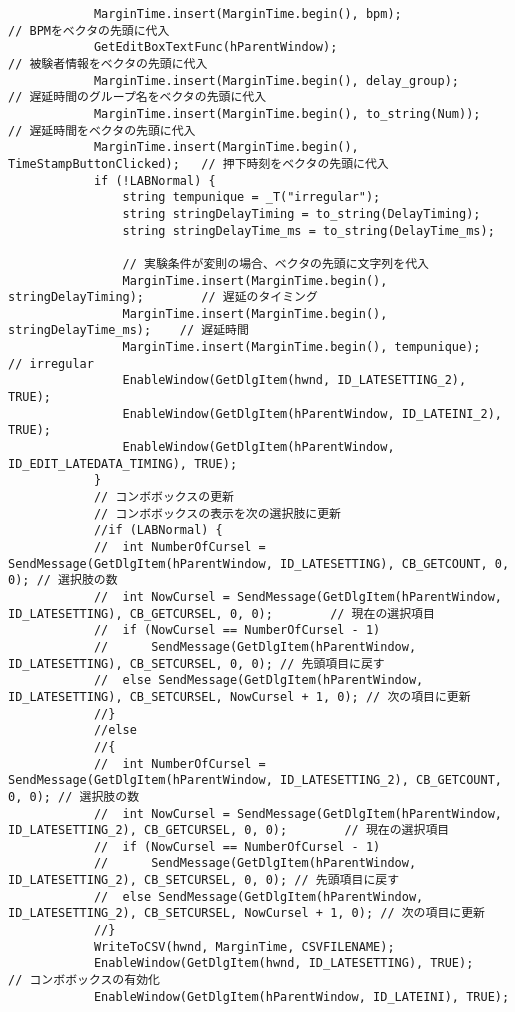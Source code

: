 \begin{verbatim}
			MarginTime.insert(MarginTime.begin(), bpm);                                // BPMをベクタの先頭に代入
			GetEditBoxTextFunc(hParentWindow);                                            // 被験者情報をベクタの先頭に代入
			MarginTime.insert(MarginTime.begin(), delay_group);                     // 遅延時間のグループ名をベクタの先頭に代入
			MarginTime.insert(MarginTime.begin(), to_string(Num));                 // 遅延時間をベクタの先頭に代入
			MarginTime.insert(MarginTime.begin(), TimeStampButtonClicked);   // 押下時刻をベクタの先頭に代入
			if (!LABNormal) {
				string tempunique = _T("irregular");
				string stringDelayTiming = to_string(DelayTiming);
				string stringDelayTime_ms = to_string(DelayTime_ms);

				// 実験条件が変則の場合、ベクタの先頭に文字列を代入
				MarginTime.insert(MarginTime.begin(), stringDelayTiming);        // 遅延のタイミング
				MarginTime.insert(MarginTime.begin(), stringDelayTime_ms);    // 遅延時間
				MarginTime.insert(MarginTime.begin(), tempunique);                // irregular
				EnableWindow(GetDlgItem(hwnd, ID_LATESETTING_2), TRUE);
				EnableWindow(GetDlgItem(hParentWindow, ID_LATEINI_2), TRUE);
				EnableWindow(GetDlgItem(hParentWindow, ID_EDIT_LATEDATA_TIMING), TRUE);
			}
			// コンボボックスの更新
			// コンボボックスの表示を次の選択肢に更新
			//if (LABNormal) {
			//	int NumberOfCursel = SendMessage(GetDlgItem(hParentWindow, ID_LATESETTING), CB_GETCOUNT, 0, 0); // 選択肢の数
			//	int NowCursel = SendMessage(GetDlgItem(hParentWindow, ID_LATESETTING), CB_GETCURSEL, 0, 0);        // 現在の選択項目
			//	if (NowCursel == NumberOfCursel - 1)
			//		SendMessage(GetDlgItem(hParentWindow, ID_LATESETTING), CB_SETCURSEL, 0, 0); // 先頭項目に戻す
			//	else SendMessage(GetDlgItem(hParentWindow, ID_LATESETTING), CB_SETCURSEL, NowCursel + 1, 0); // 次の項目に更新
			//}
			//else
			//{
			//	int NumberOfCursel = SendMessage(GetDlgItem(hParentWindow, ID_LATESETTING_2), CB_GETCOUNT, 0, 0); // 選択肢の数
			//	int NowCursel = SendMessage(GetDlgItem(hParentWindow, ID_LATESETTING_2), CB_GETCURSEL, 0, 0);        // 現在の選択項目
			//	if (NowCursel == NumberOfCursel - 1)
			//		SendMessage(GetDlgItem(hParentWindow, ID_LATESETTING_2), CB_SETCURSEL, 0, 0); // 先頭項目に戻す
			//	else SendMessage(GetDlgItem(hParentWindow, ID_LATESETTING_2), CB_SETCURSEL, NowCursel + 1, 0); // 次の項目に更新
			//}
			WriteToCSV(hwnd, MarginTime, CSVFILENAME);
			EnableWindow(GetDlgItem(hwnd, ID_LATESETTING), TRUE);        // コンボボックスの有効化
			EnableWindow(GetDlgItem(hParentWindow, ID_LATEINI), TRUE);


\end{verbatim}
